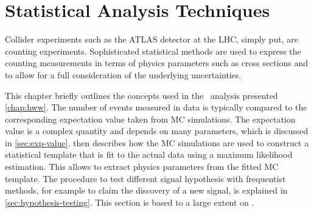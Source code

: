 \chapter{Statistical Analysis Techniques}
\label{chap:statistics}

Collider experiments such as the ATLAS detector at the LHC, simply put, are counting experiments. 
Sophisticated statistical methods are used to express the counting measurements in terms of physics parameters such as cross sections and to allow for a full consideration of the underlying uncertainties. 

This chapter briefly outlines the concepts used in the \HWWhalfdet\ analysis presented \cref{chap:hww}.
The number of events measured in data is typically compared to the corresponding expectation value taken from MC simulations. The expectation value is a complex quantity and depends on many parameters, which is discussed in \cref{sec:exp-value}.
 then describes how the MC simulations are used to construct a statistical template that is fit to the actual data using a maximum likelihood estimation. This allows to extract physics parameters from the fitted MC template.
The procedure to test different signal hypothesis with frequentist methods, for example to claim the discovery of a new signal, is explained in \cref{sec:hypothesis-testing}.
This section is based to a large extent on .


